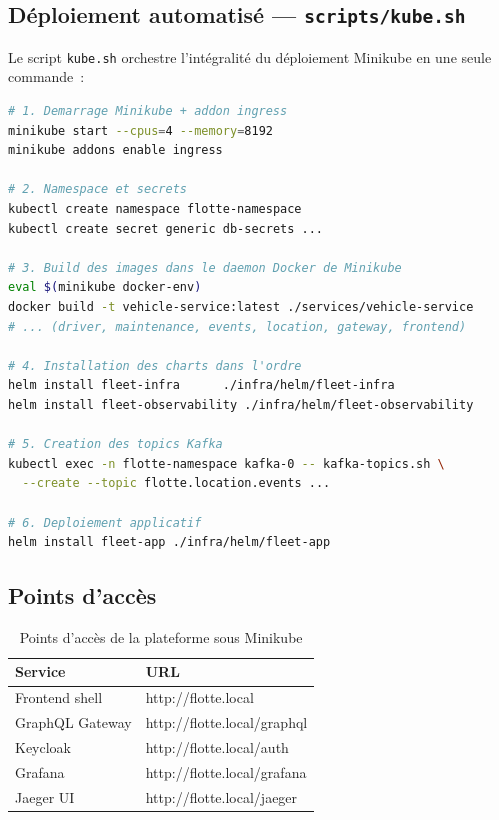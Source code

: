 \documentclass[12pt,a4paper]{article}
\begin{document}
\subsection{D\'{e}ploiement automatis\'{e} --- \texttt{scripts/kube.sh}}

Le script \texttt{kube.sh} orchestre l'int\'{e}gralit\'{e} du d\'{e}ploiement Minikube
en une seule commande~:

\begin{lstlisting}[language=bash, caption=\'{E}tapes du script \texttt{kube.sh}]
# 1. Demarrage Minikube + addon ingress
minikube start --cpus=4 --memory=8192
minikube addons enable ingress

# 2. Namespace et secrets
kubectl create namespace flotte-namespace
kubectl create secret generic db-secrets ...

# 3. Build des images dans le daemon Docker de Minikube
eval $(minikube docker-env)
docker build -t vehicle-service:latest ./services/vehicle-service
# ... (driver, maintenance, events, location, gateway, frontend)

# 4. Installation des charts dans l'ordre
helm install fleet-infra      ./infra/helm/fleet-infra
helm install fleet-observability ./infra/helm/fleet-observability

# 5. Creation des topics Kafka
kubectl exec -n flotte-namespace kafka-0 -- kafka-topics.sh \
  --create --topic flotte.location.events ...

# 6. Deploiement applicatif
helm install fleet-app ./infra/helm/fleet-app
\end{lstlisting}

\subsection{Points d'acc\`{e}s}

\begin{table}[H]
\centering
\renewcommand{\arraystretch}{1.4}
\begin{tabular}{
  >{\raggedright\arraybackslash}p{4cm}
  >{\ttfamily\raggedright\arraybackslash}p{7cm}
}
\toprule
\rowcolor{secondary}
\textbf{Service} & \textbf{URL} \\
\midrule
Frontend shell   & http://flotte.local \\
\rowcolor{rowgray}
GraphQL Gateway  & http://flotte.local/graphql \\
Keycloak         & http://flotte.local/auth \\
\rowcolor{rowgray}
Grafana          & http://flotte.local/grafana \\
Jaeger UI        & http://flotte.local/jaeger \\
\bottomrule
\end{tabular}
\caption{Points d'acc\`{e}s de la plateforme sous Minikube}
\end{table}
\end{document}
